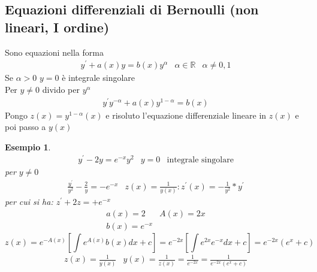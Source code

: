 \documentclass{book}
\newtheorem{esempio}{Esempio}
\begin{document}
\subsection{Equazioni differenziali di Bernoulli (non lineari, I ordine)}
Sono equazioni nella forma
\begin{eqnarray*}
	y^\prime + a(x)y=b(x)y^\alpha &\alpha\in \mathds{R} & \alpha\neq 0,1
\end{eqnarray*}
Se $\alpha >0$ $y=0$ è integrale singolare\\
Per $y\neq 0$ divido per $y^\alpha$
\begin{eqnarray}
	y^\prime y^{-\alpha}+a(x)y^{1-\alpha}=b(x)
\end{eqnarray}
Pongo $z(x)=y^{1-\alpha}(x)$ e risoluto l'equazione differenziale lineare in
$z(x)$ e poi passo a $y(x)$
\begin{esempio}
	\begin{eqnarray*}
		y^\prime-2y =e^{-x}y^2 & y=0 &\text{integrale singolare}
	\end{eqnarray*}
	per $y\neq 0$
	\begin{eqnarray*}
		\frac{y^\prime}{y^2}-\frac{2}{y}=-e^{-x} &
		z(x)=\frac{1}{y(x)}:z^\prime(x)=-\frac{1}{y^2}*y^\prime
	\end{eqnarray*}
	per cui si ha: $z^\prime+2z=+e^{-x}$
	\begin{eqnarray*}
		a(x)=2 & A(x)=2x\\
		b(x)=e^{-x}
	\end{eqnarray*}
	\begin{equation*}
		z(x)=e^{-A(x)}\left[\int e^{A(x)}b(x)dx+c\right]=e^{-2x}\left[\int
		e^{2x}e^{-x}dx+c\right]=e^{-2x}(e^x+c)
	\end{equation*}
	\begin{eqnarray*}
		z(x)=\frac{1}{y(x)} &
		y(x)=\frac{1}{z(x)}=\frac{1}{e^{-2x}}=\frac{1}{e^{-2x}(e^x+c)}
	\end{eqnarray*}
\end{esempio}
\clearpage
\end{document}
